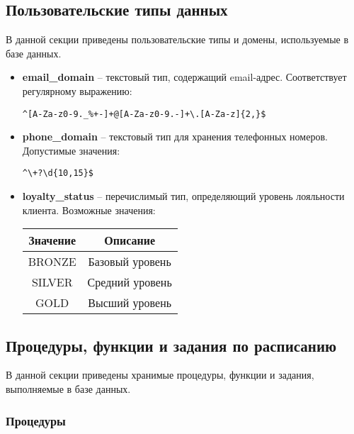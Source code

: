 \subsection{Пользовательские типы данных}\label{subsec:-usertypes:-}

В данной секции приведены пользовательские типы и домены, используемые в базе данных.

\begin{itemize}
    \item \textbf{email\_domain} – текстовый тип, содержащий email-адрес.
    Соответствует регулярному выражению:
    \begin{verbatim}
^[A-Za-z0-9._%+-]+@[A-Za-z0-9.-]+\.[A-Za-z]{2,}$
    \end{verbatim}

    \item \textbf{phone\_domain} – текстовый тип для хранения телефонных номеров.
    Допустимые значения:
    \begin{verbatim}
^\+?\d{10,15}$
    \end{verbatim}

    \item \textbf{loyalty\_status} – перечислимый тип, определяющий уровень лояльности клиента.
    Возможные значения:
    \begin{center}
        \begin{tabular}{|c|c|}
            \hline
            Значение & Описание        \\
            \hline
            BRONZE   & Базовый уровень \\
            SILVER   & Средний уровень \\
            GOLD     & Высший уровень  \\
            \hline
        \end{tabular}
    \end{center}
\end{itemize}

\subsection{Процедуры, функции и задания по расписанию}\label{subsec:-procedures:-}

В данной секции приведены хранимые процедуры, функции и задания, выполняемые в базе данных.

\subsubsection{Процедуры}

